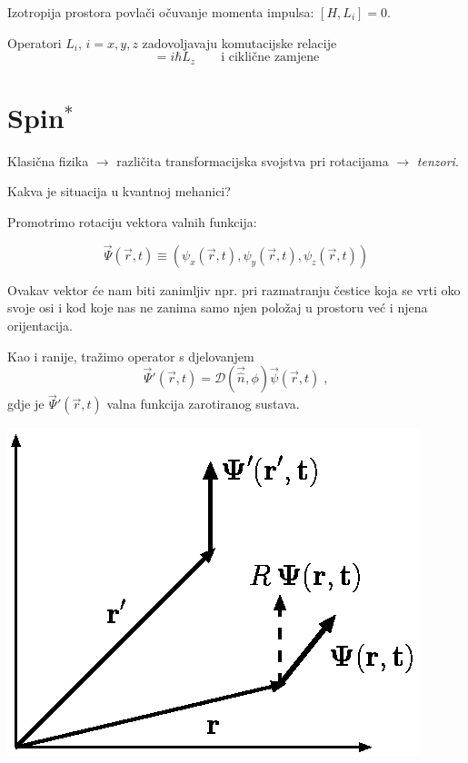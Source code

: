 Izotropija prostora povlači očuvanje momenta impulsa: $[H,L_{i}]=0$.

Operatori $L_i$, $i=x,y,z$ zadovoljavaju komutacijske relacije
\begin{equation}
   [L_x, L_y] = i\hbar  L_z  \qquad \text{i ciklične zamjene}
\end{equation}

\section{Spin$^*$}

Klasična fizika $\to$ različita transformacijska svojstva pri
rotacijama $\to$ \emph{tenzori}.

Kakva je situacija u kvantnoj mehanici?

Promotrimo rotaciju vektora valnih funkcija:

\begin{displaymath}
  \vec{\Psi}(\vec{r},t) \equiv (\psi_{x}(\vec{r}, t),
 \psi_{y}(\vec{r}, t), \psi_{z}(\vec{r}, t))
\end{displaymath}

Ovakav vektor će nam biti zanimljiv npr. pri razmatranju čestice koja se vrti 
oko svoje osi i kod koje nas ne zanima samo 
njen položaj u prostoru već i njena orijentacija.

Kao i ranije, tražimo operator s djelovanjem
\begin{displaymath}
  \vec{\Psi}'(\vec{r},t) = \mathcal{D}
(\vec{\hat{n}},\phi) \vec{\psi}(\vec{r},t) \;,
\end{displaymath}
gdje je $\vec{\Psi}'(\vec{r},t)$ valna funkcija zarotiranog sustava.

\centerline{\includegraphics{pics/spin.eps}}

